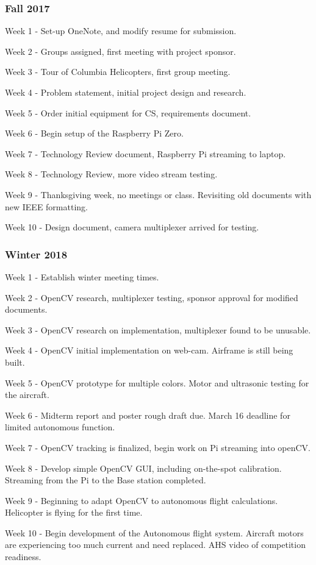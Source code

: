 \documentclass[onecolumn, draftclsnofoot,10pt, compsoc]{IEEEtran}
\begin{document}
\subsubsection{Fall 2017}
		\begin{description}
			\item{Week 1} - Set-up OneNote, and modify resume for submission.
			\item{Week 2} - Groups assigned, first meeting with project sponsor.
			\item{Week 3} - Tour of Columbia Helicopters, first group meeting.
            \item{Week 4} - Problem statement, initial project design and research.
			\item{Week 5} - Order initial equipment for CS, requirements document.
			\item{Week 6} - Begin setup of the Raspberry Pi Zero.
            \item{Week 7} - Technology Review document, Raspberry Pi streaming to laptop.
			\item{Week 8} - Technology Review, more video stream testing.
			\item{Week 9} - Thanksgiving week, no meetings or class. Revisiting old documents with new IEEE formatting. 
            \item{Week 10} - Design document, camera multiplexer arrived for testing.
		\end{description}
\subsubsection{Winter 2018}
		\begin{description}
			\item{Week 1} - Establish winter meeting times. 
			\item{Week 2} - OpenCV research, multiplexer testing, sponsor approval for modified documents.
			\item{Week 3} - OpenCV research on implementation, multiplexer found to be unusable.
            \item{Week 4} - OpenCV initial implementation on web-cam. Airframe is still being built.
			\item{Week 5} - OpenCV prototype for multiple colors. Motor and ultrasonic testing for the aircraft. 
			\item{Week 6} - Midterm report and poster rough draft due. March 16 deadline for limited autonomous function.
            \item{Week 7} - OpenCV tracking is finalized, begin work on Pi streaming into openCV.
			\item{Week 8} - Develop simple OpenCV GUI, including on-the-spot calibration. Streaming from the Pi to the Base station completed.
			\item{Week 9} - Beginning to adapt OpenCV to autonomous flight calculations. Helicopter is flying for the first time. 
            \item{Week 10} - Begin development of the Autonomous flight system. Aircraft motors are experiencing too much current and need replaced. AHS video of competition readiness. 
		\end{description}
\end{document}
